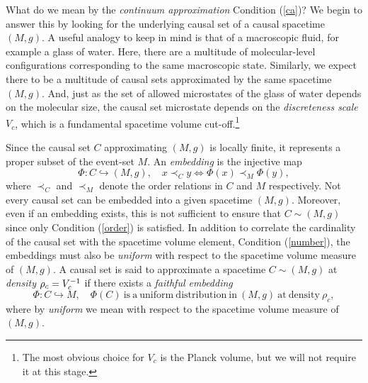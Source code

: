 What do we mean by the \emph{continuum approximation}   Condition (\ref{ca})?  We begin to answer this  by looking
for the underlying causal set of a  causal spacetime $(M,g)$.  A useful analogy to keep in mind  is that of a
macroscopic  fluid, for example a glass of water.  Here, there are a multitude of  molecular-level configurations
corresponding to the same macroscopic state.  Similarly, we expect there to be a multitude of  causal sets  approximated by the same
spacetime $(M,g)$. And,  just as the set of allowed microstates of the glass of
water depends on the molecular size, the causal set microstate depends on the \emph{discreteness scale $V_c$}, which is
a fundamental spacetime volume cut-off.\footnote{The most obvious choice for $V_c$ is the Planck volume, but we will not
  require it at this stage.}

Since the causal set $C$ approximating $(M,g)$ is locally finite,  it represents a proper subset of the event-set $M$.
An   \emph{  embedding} is  the injective map
\begin{equation} \Phi:C \hookrightarrow (M,g), \quad x \prec_C y \Leftrightarrow \Phi(x) \prec_M \Phi(y),
\end{equation} 
 where $\prec_{C} $ and $\prec_M$ denote  the order relations in $C $ and $ M$ respectively.  Not every causal set can
 be embedded into a given spacetime $(M,g)$. Moreover, even if an embedding exists, this is not sufficient to ensure
 that $C \sim (M,g)$ since only Condition (\ref{order})  is satisfied.  In addition to correlate the cardinality
 of the causal set with the spacetime volume element, Condition (\ref{number}),   the embeddings must also be
 \emph{uniform}  with respect
 to the spacetime volume measure of   $(M,g)$.  A causal set  is said to approximate a spacetime $C \sim (M,g)$ at \emph{density}
 $\rho_c=V_c^{-1}$ if there exists    
 a \emph{faithful embedding} 
 \begin{equation}
   \Phi: C \hookrightarrow M, \quad \Phi(C) \mathrm{\ is \ a \ uniform \ distribution \ in \ }(M,g) \mathrm{\ at \
     density \ } \rho_c, 
 \end{equation}
 where by \emph{uniform} we mean with respect to the spacetime volume measure of   $(M,g)$. 
 
 


